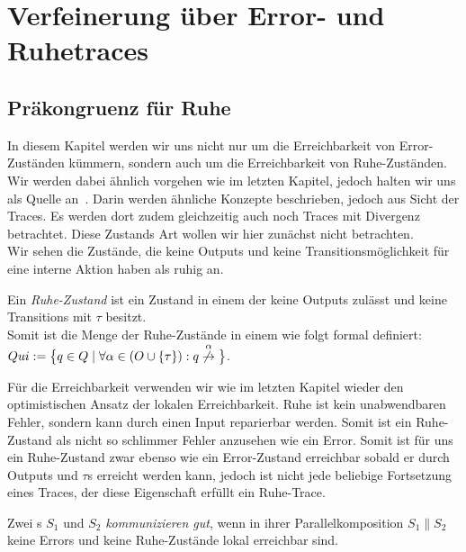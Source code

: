 \chapter{Verfeinerung über Error- und Ruhetraces}

\section{Präkongruenz für Ruhe}

In diesem Kapitel werden wir uns nicht nur um die Erreichbarkeit von
Error-Zuständen kümmern, sondern auch um die Erreichbarkeit von
Ruhe-Zuständen. Wir werden dabei ähnlich vorgehen wie im letzten Kapitel,
jedoch halten wir uns als Quelle an~\cite{Chilton2013}. Darin werden ähnliche
Konzepte beschrieben, jedoch aus Sicht der Traces. Es werden dort zudem
gleichzeitig auch noch Traces mit Divergenz betrachtet. Diese Zustands Art
wollen wir hier zunächst nicht betrachten.\\
Wir sehen die Zustände, die keine Outputs und keine Transitionsmöglichkeit für
eine interne Aktion haben als ruhig an.

\begin{Def}[Ruhe]
  Ein \emph{Ruhe-Zustand} ist ein Zustand in einem \EIO{} der keine
  Outputs zulässt und keine Transitions mit $\tau$ besitzt.\\
  Somit ist die Menge der Ruhe-Zustände in einem \EIO{} wie folgt formal
  definiert: $Qui:=\big\{q\in Q\mid \forall \alpha\in (O\cup \{\tau\}): q
  \overset{\alpha}{\not{\hspace{-0.1cm}\rightarrow}}\big\}$.
\end{Def}

Für die Erreichbarkeit verwenden wir wie im letzten Kapitel wieder den
optimistischen Ansatz der lokalen Erreichbarkeit. Ruhe ist kein
unabwendbaren Fehler, sondern kann durch einen Input reparierbar werden. Somit
ist ein Ruhe-Zustand als nicht so \glqq{}schlimmer Fehler\grqq{}  anzusehen wie
ein Error. Somit ist für uns ein Ruhe-Zustand zwar ebenso wie ein Error-Zustand
erreichbar sobald er durch Outputs und $\tau$s erreicht werden kann, jedoch ist
nicht jede beliebige Fortsetzung eines Traces, der diese Eigenschaft erfüllt
ein Ruhe-Trace.

\begin{Def}
  Zwei \EIO{}s $S_1$ und $S_2$ \emph{kommunizieren gut}, wenn in ihrer
  Parallelkomposition $S_1\| S_2$ keine Errors und keine Ruhe-Zustände lokal
  erreichbar sind.
\end{Def}

